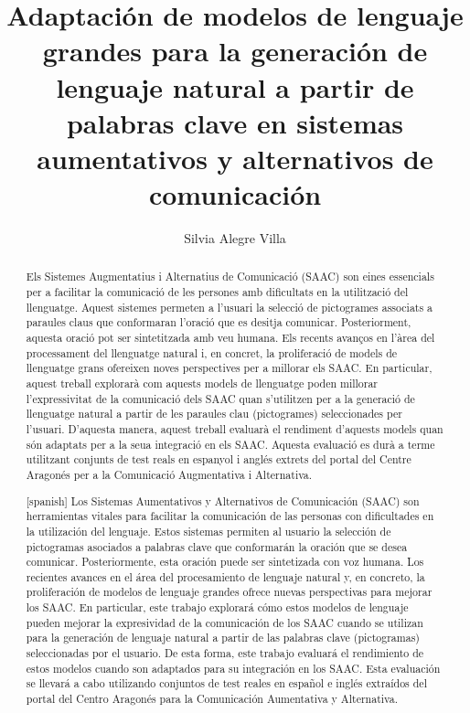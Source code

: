 \documentclass[11pt,spanish,listoffigures,listoftables]{tfgetsinf}
\title{Adaptación de modelos de lenguaje grandes para la generación
de lenguaje natural a partir de palabras clave en sistemas
aumentativos y alternativos de comunicación}
\author{Silvia Alegre Villa}
\begin{document}

\begin{abstract}
Els Sistemes Augmentatius i Alternatius de Comunicació (SAAC) son eines essencials per a facilitar la comunicació de les persones amb dificultats en la utilització del llenguatge. Aquest sistemes permeten a l'usuari la selecció de pictogrames associats a paraules claus que conformaran l'oració que es desitja comunicar. Posteriorment, aquesta oració pot ser sintetitzada amb veu humana. Els recents avanços en l'àrea del processament del llenguatge natural i, en concret, la proliferació de models de llenguatge grans ofereixen noves perspectives per a millorar els SAAC. En particular, aquest treball explorarà com aquests models de llenguatge poden millorar l'expressivitat de la comunicació dels SAAC quan s'utilitzen per a la generació de llenguatge natural a partir de les paraules clau (pictogrames) seleccionades per l'usuari. D'aquesta manera, aquest treball evaluarà el rendiment d'aquests models quan són adaptats per a la seua integració en els SAAC. Aquesta evaluació es durà a terme utilitzant conjunts de test reals en espanyol i anglés extrets del portal del Centre Aragonés per a la Comunicació Augmentativa i Alternativa.
\end{abstract}
\begin{abstract}[spanish]
 Los Sistemas Aumentativos y Alternativos de Comunicación (SAAC) son herramientas vitales para facilitar la comunicación de las personas con dificultades en la utilización del lenguaje. Estos sistemas permiten al usuario la selección de pictogramas asociados a palabras clave que conformarán la oración que se desea comunicar. Posteriormente, esta oración puede ser sintetizada con voz humana. Los recientes avances en el área del procesamiento de lenguaje natural y, en concreto, la proliferación de modelos de lenguaje grandes ofrece nuevas perspectivas para mejorar los SAAC. En particular, este trabajo explorará cómo estos modelos de lenguaje pueden mejorar la expresividad de la comunicación de los SAAC cuando se utilizan para la generación de lenguaje natural a partir de las palabras clave (pictogramas) seleccionadas por el usuario. De esta forma, este trabajo evaluará el rendimiento de estos modelos cuando son adaptados para su integración en los SAAC. Esta evaluación se llevará a cabo utilizando conjuntos de test reales en español e inglés extraídos del portal del Centro Aragonés para la Comunicación Aumentativa y Alternativa.
\end{abstract}
\end{document}

